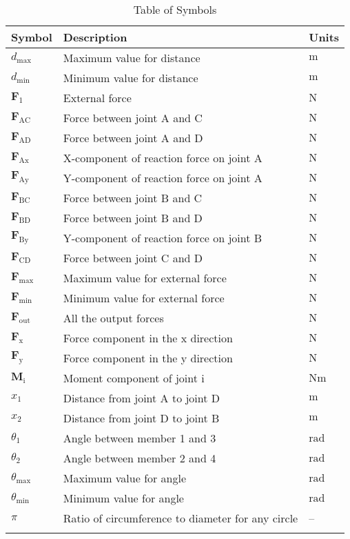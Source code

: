 \documentclass[12pt]{article}
\begin{document}
\begin{longtable}{l l l}
\toprule
\textbf{Symbol} & \textbf{Description} & \textbf{Units}
\\
\midrule
\endhead
${d_{\text{max}}}$ & Maximum  value for distance & ${\text{m}}$
\\
${d_{\text{min}}}$ & Minimum  value for distance & ${\text{m}}$
\\
${\mathbf{F}_{1}}$ & External force & ${\text{N}}$
\\
${\mathbf{F}_{\text{AC}}}$ & Force between joint A and C & ${\text{N}}$
\\
${\mathbf{F}_{\text{AD}}}$ & Force between joint A and D & ${\text{N}}$
\\
${\mathbf{F}_{\text{Ax}}}$ & X-component of reaction force on joint A & ${\text{N}}$
\\
${\mathbf{F}_{\text{Ay}}}$ & Y-component of reaction force on joint A & ${\text{N}}$
\\
${\mathbf{F}_{\text{BC}}}$ & Force between joint B and C & ${\text{N}}$
\\
${\mathbf{F}_{\text{BD}}}$ & Force between joint B and D & ${\text{N}}$
\\
${\mathbf{F}_{\text{By}}}$ & Y-component of reaction force on joint B & ${\text{N}}$
\\
${\mathbf{F}_{\text{CD}}}$ & Force between joint C and D & ${\text{N}}$
\\
${\mathbf{F}_{\text{max}}}$ & Maximum  value for external force & ${\text{N}}$
\\
${\mathbf{F}_{\text{min}}}$ & Minimum  value for external force & ${\text{N}}$
\\
${\mathbf{F}_{\text{out}}}$ & All the output forces & ${\text{N}}$
\\
${\mathbf{F}_{\text{x}}}$ & Force component in the x direction & ${\text{N}}$
\\
${\mathbf{F}_{\text{y}}}$ & Force component in the y direction & ${\text{N}}$
\\
${\mathbf{M}_{\text{i}}}$ & Moment component of joint i & $\text{N}\text{m}$
\\
${x_{\text{1}}}$ & Distance from joint A to joint D & ${\text{m}}$
\\
${x_{\text{2}}}$ & Distance from joint D to joint B & ${\text{m}}$
\\
${θ_{\text{1}}}$ & Angle between member 1 and 3 & ${\text{rad}}$
\\
${θ_{\text{2}}}$ & Angle between member 2 and 4 & ${\text{rad}}$
\\
${θ_{\text{max}}}$ & Maximum  value for angle & ${\text{rad}}$
\\
${θ_{\text{min}}}$ & Minimum  value for angle & ${\text{rad}}$
\\
$π$ & Ratio of circumference to diameter for any circle & --
\\
\bottomrule
\caption{Table of Symbols}
\label{Table:ToS}
\end{longtable}
\end{document}
